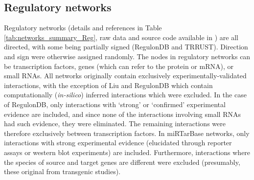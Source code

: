 

\newpage
\subsection{Regulatory networks}\label{sup_realnets_reg}
    Regulatory networks (details and references in Table \ref{tab:networks_summary_Reg}, raw data and source code available in  \cite{atiia_case-study_2017}) are all directed, with some being partially signed (RegulonDB and TRRUST). Direction and sign were otherwise assigned randomly. The nodes in regulatory networks can be transcription factors, genes (which can refer to the protein or mRNA), or small RNAs. All networks originally contain exclusively experimentally-validated interactions, with the exception of Liu and RegulonDB which contain computationally (\textit{in-silico}) inferred interactions which were excluded. In the case of RegulonDB, only interactions with  `strong' or `confirmed' experimental evidence are included, and since none of the interactions involving small RNAs had such evidence, they were eliminated. The remaining interactions were therefore exclusively between transcription factors. In miRTarBase networks, only interactions with strong experimental evidence (elucidated through reporter assays or western blot experiments) are included. Furthermore, interactions where the species of source and target genes are different were excluded (presumably, these original from  transgenic studies).

